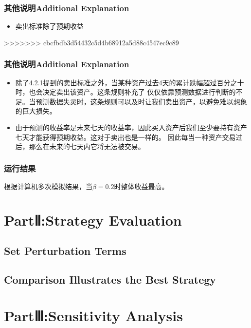 \documentclass{mcmthesis}
\begin{document}
\subsubsection{其他说明Additional Explanation}
\begin{itemize}
  \item 卖出标准除了预期收益
\end{itemize}
>>>>>>> cbcfbdb3d54432c5d4b68912a5d88c4547ec9c89

\subsubsection{其他说明Additional Explanation}
\begin{itemize}
  \item 除了4.2.1提到的卖出标准之外，当某种资产过去4天的累计跌幅超过百分之十时，也会决定卖出该资产。这条规则补充了
  仅仅依靠预测数据进行判断的不足。当预测数据失灵时，这条规则可以及时让我们卖出资产，以避免难以想象的巨大损失。
  \item 由于预测的收益率是未来七天的收益率，因此买入资产后我们至少要持有资产七天才能获得预期收益。这对于卖出也是一样的。
  因此每当一种资产交易过后，那么在未来的七天内它将无法被交易。

\end{itemize}
\subsubsection{运行结果}
根据计算机多次模拟结果，当$\beta =0.2$时整体收益最高。





\section{PartⅡ:Strategy Evaluation}
\subsection{Set Perturbation Terms }%

\subsection{Comparison Illustrates the Best Strategy}




\section{PartⅢ:Sensitivity Analysis}
\end{document}

